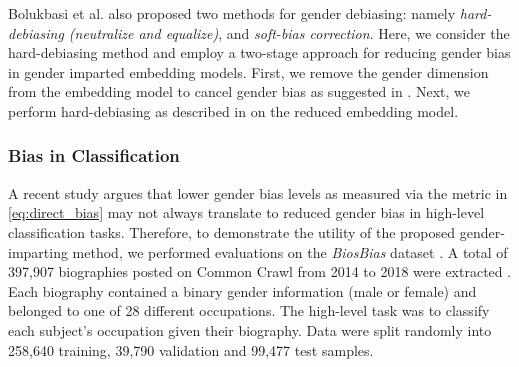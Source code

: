 \documentclass[11pt,a4paper]{article}
\begin{document}

Bolukbasi et al. \citep{bolukbasi16debiasing} also proposed two methods for gender debiasing: namely \textit{hard-debiasing (neutralize and equalize)}, and \textit{soft-bias correction}. Here, we consider the hard-debiasing method and employ a two-stage approach for reducing gender bias in gender imparted embedding models. First, we remove the gender dimension from the embedding model to cancel gender bias as suggested in \citep{dufter19ultraDense}. Next, we perform hard-debiasing as described in \citep{bolukbasi16debiasing} on the reduced embedding model.

\subsubsection{Bias in Classification}

A recent study \citep{prost19biasTextClassif} argues that lower gender bias levels as measured via the metric in \eqref{eq:direct_bias} may not always translate to reduced gender bias in high-level classification tasks. Therefore, to demonstrate the utility of the proposed gender-imparting method, we performed evaluations on the \textit{BiosBias} dataset \citep{de19biosbias}. A total of 397,907 biographies posted on Common Crawl from 2014 to 2018 were extracted \citep{de19biosbias}. Each biography contained a binary gender information (male or female) and belonged to one of 28 different occupations. The high-level task was to classify each subject's occupation given their biography. Data were split randomly into 258,640 training, 39,790 validation and 99,477 test samples.
\end{document}
